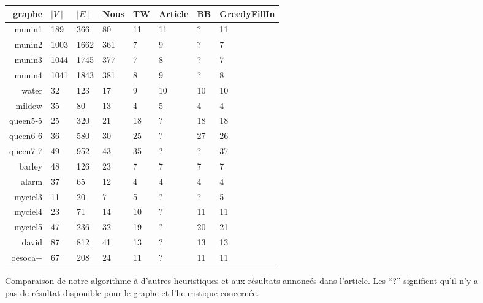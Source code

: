 \documentclass{article}
\begin{document}
\begin{figure}
  \centering
  \begin{tabular}{r|l|l|l|l|l|l|l}
    graphe   & $\mid V \mid$ & $\mid E \mid$ & Nous  & TW & Article & BB & GreedyFillIn\\
    \hline
    munin1   & 189 & 366 & 80   & 11 & 11 & ? & 11\\
    munin2   & 1003& 1662&361  & 7  & 9 & ? & 7\\
    munin3   & 1044& 1745&377  & 7  & 8 & ? & 7\\
    munin4   & 1041& 1843&381  & 8  & 9 & ? & 8\\
    water    & 32  &123 & 17   & 9  & 10 & 10 & 10 \\
    mildew   & 35  & 80 & 13   & 4  & 5 & 4 & 4 \\
    queen5-5 & 25 & 320 &21   & 18 & ? & 18 & 18\\
    queen6-6 & 36 & 580 &30   & 25 & ? & 27 & 26\\
    queen7-7 & 49 & 952 &43   & 35 & ? & ? & 37\\
    barley   & 48 & 126 &23   & 7  & 7 & 7 & 7 \\
    alarm    & 37 & 65 &12   & 4  &  4 & 4 & 4\\
    myciel3  & 11 & 20 &7    & 5  & ? & ? & 5\\
    myciel4  & 23 & 71& 14   & 10 & ? & 11 & 11\\
    myciel5  & 47 & 236&32   & 19 & ? & 20 & 21\\
    david    & 87 & 812 &41   & 13 & ? & 13 & 13\\
    oesoca+  & 67 & 208 &24   & 11 & ? & 11 & 11\\
  \end{tabular}
  \caption{Comparaison de notre algorithme à d'autres heuristiques et
    aux résultats annoncés dans l'article. Les ``?'' signifient qu'il
    n'y a pas de résultat disponible pour le graphe et l'heuristique
    concernée.}
  \label{fig}
\end{figure}




\end{document}
